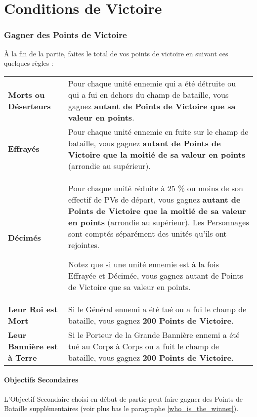 
\hypertarget{victorypoints}{\part{Conditions de Victoire}}
\label{scoring_and_victory_conditions}

\section{Gagner des Points de Victoire}

À la fin de la partie, faites le total de vos points de victoire en suivant ces quelques règles :

\noindent\begin{tabular}{>{\bfseries\raggedleft}p{2.2cm}p{13.5cm}}
Morts ou Déserteurs & Pour chaque unité ennemie qui a été détruite ou qui a fui en dehors du champ de bataille, vous gagnez \textbf{autant de Points de Victoire que sa valeur en points}. \tabularnewline
Effrayés & Pour chaque unité ennemie en fuite sur le champ de bataille, vous gagnez \textbf{autant de Points de Victoire que la moitié de sa valeur en points} (arrondie au supérieur). \tabularnewline
Décimés & Pour chaque unité réduite à 25 \% ou moins de son effectif de PVs de départ, vous gagnez \textbf{autant de Points de Victoire que la moitié de sa valeur en points} (arrondie au supérieur). Les Personnages sont comptés séparément des unités qu'ils ont rejointes.

Notez que si une unité ennemie est à la fois Effrayée et Décimée, vous gagnez autant de Points de Victoire que sa valeur en points. \tabularnewline
Leur Roi est Mort & Si le Général ennemi a été tué ou a fui le champ de bataille, vous gagnez \textbf{200 Points de Victoire}. \tabularnewline
Leur Bannière est à Terre & Si le Porteur de la Grande Bannière ennemi a été tué au Corps à Corps ou a fuit le champ de bataille, vous gagnez \textbf{200 Points de Victoire}. \tabularnewline
\end{tabular}

\hypertarget{secondaryobjectives}{\subsection{Objectifs Secondaires}}
\label{secondary_objectives}

L'Objectif Secondaire choisi en début de partie peut faire gagner des Points de Bataille supplémentaires (voir plus bas le paragraphe \ref{who_is_the_winner}).

